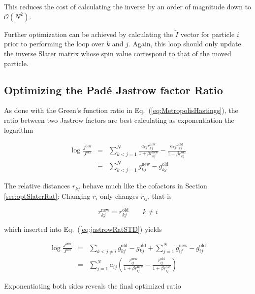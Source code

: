 This reduces the cost of calculating the inverse by an order of magnitude down to $\mathcal{O}(N^2)$.

Further optimization can be achieved by calculating the $\tilde I$ vector for particle $i$ prior to performing the loop over $k$ and $j$. Again, this loop should only update the inverse Slater matrix whose spin value correspond to that of the moved particle.

\subsection{Optimizing the Padé Jastrow factor Ratio}

As done with the Green's function ratio in Eq.~(\ref{eq:MetropolisHastings}), the ratio between two Jastrow factors are best calculating as exponentiation the logarithm

\begin{eqnarray}
 \log \frac{J^\mathrm{new}}{J^\mathrm{old}} &=& \sum_{k<j = 1}^N \frac{a_{kj}r^\mathrm{new}_{kj}}{1 + \beta r^\mathrm{new}_{kj}} - \frac{a_{kj}r^\mathrm{old}_{kj}}{1 + \beta r^\mathrm{old}_{kj}} \\
                      &\equiv& \sum_{k<j = 1}^N g^\mathrm{new}_{kj} - g^\mathrm{old}_{kj} \label{eq:jastrowRatSTD}
\end{eqnarray}

The relative distances $r_{kj}$ behave much like the cofactors in Section \ref{sec:optSlaterRat}: Changing $r_i$ only changes $r_{ij}$, that is

\begin{equation}
 r^\mathrm{new}_{kj} = r^\mathrm{old}_{kj} \qquad k \ne i 
\end{equation}

which inserted into Eq.~(\ref{eq:jastrowRatSTD}) yields

\begin{eqnarray}
  \log\frac{J^\mathrm{new}}{J^\mathrm{old}} &=& \sum_{k<j \ne i} g^\mathrm{old}_{kj} - g^\mathrm{old}_{kj} + \sum_{j = 1}^N g^\mathrm{new}_{ij} - g^\mathrm{old}_{ij} \nonumber\\
                                            &=& \sum_{j = 1}^N a_{ij}\left(\frac{r^\mathrm{new}_{ij}}{1 + \beta r^\mathrm{new}_{ij}} - \frac{r^\mathrm{old}_{ij}}{1 + \beta r^\mathrm{old}_{ij}}\right)
\end{eqnarray}

Exponentiating both sides reveals the final optimized ratio 



